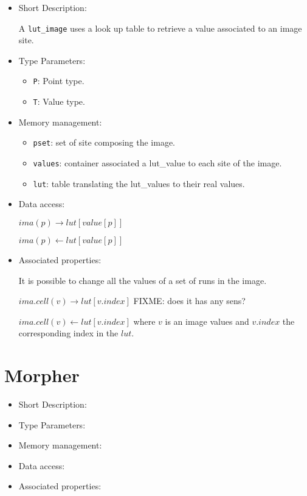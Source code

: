 \begin{itemize}
\item{Short Description:}

A \verb+lut_image+ uses a look up table to retrieve a value
associated to an image site.


\item{Type Parameters:}

\begin{itemize}
\item \verb+P+: Point type.
\item \verb+T+: Value type.
\end{itemize}

\item{Memory management:}

\begin{itemize}
\item \verb+pset+: set of site composing the image.
\item \verb+values+: container associated a lut\_value to each site of the
image.
\item \verb+lut+: table translating the lut\_values to their real values.
\end{itemize}

\item{Data access:}

$ima(p) \rightarrow lut[value[p]]$

$ima(p) \leftarrow lut[value[p]]$

\item{Associated properties:}


It is possible to change all the values of a set of runs in the image.

$ima.cell(v) \rightarrow lut[v.index]$ FIXME: does it has any sens?

$ima.cell(v) \leftarrow  lut[v.index]$ where $v$ is an image values
and $v.index$ the corresponding index in the  $lut$.


\end{itemize}




\section{Morpher}



\begin{itemize}
\item{Short Description:}



\item{Type Parameters:}


\item{Memory management:}


\item{Data access:}


\item{Associated properties:}

\end{itemize}
